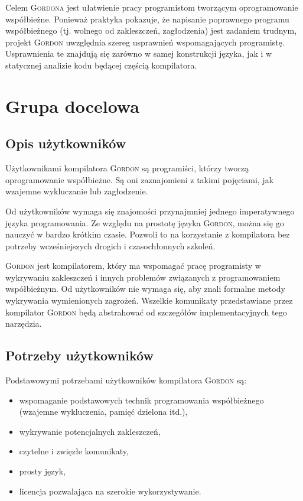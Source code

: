\documentclass{documentation}
\begin{document}
Celem \textsc{Gordona} jest ułatwienie pracy programistom tworzącym oprogramowanie współbieżne. Ponieważ praktyka pokazuje, że napisanie poprawnego programu współbieżnego (tj. wolnego od zakleszczeń, zagłodzenia) jest zadaniem trudnym, projekt \textsc{Gordon} uwzględnia szereg usprawnień wspomagających programistę. Usprawnienia te znajdują się zarówno w samej konstrukcji języka, jak i w statycznej analizie kodu będącej częścią kompilatora.
\section{Grupa docelowa}
\subsection{Opis użytkowników}
\noindent Użytkownikami kompilatora \textsc{Gordon} są programiści, którzy tworzą oprogramowanie współbieżne. Są oni zaznajomieni z takimi pojęciami, jak wzajemne wykluczanie lub zagłodzenie.

Od użytkowników wymaga się znajomości przynajmniej jednego imperatywnego języka programowania. Ze względu na prostotę języka \textsc{Gordon}, można się go nauczyć w bardzo krótkim czasie. Pozwoli to na korzystanie z kompilatora bez potrzeby wcześniejszych drogich i czasochłonnych szkoleń.

\textsc{Gordon} jest kompilatorem, który ma wspomagać pracę programisty w wykrywaniu zakleszczeń i innych problemów związanych z programowaniem współbieżnym. Od użytkowników nie wymaga się, aby znali formalne metody wykrywania wymienionych zagrożeń. Wszelkie komunikaty przedstawiane przez kompilator \textsc{Gordon} będą abstrahować od szczegółów implementacyjnych tego narzędzia.

\subsection{Potrzeby użytkowników}
\noindent Podstawowymi potrzebami użytkowników kompilatora \textsc{Gordon} są:
\begin{itemize}
\item wspomaganie podstawowych technik programowania współbieżnego (wzajemne wykluczenia, pamięć dzielona itd.),
\item wykrywanie potencjalnych zakleszczeń,
\item czytelne i zwięzłe komunikaty,
\item prosty język,
\item licencja pozwalająca na szerokie wykorzystywanie.
\end{itemize}
\end{document}
